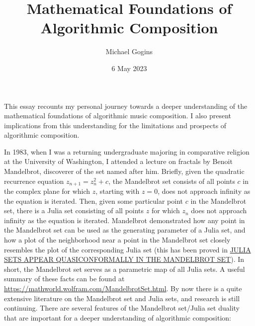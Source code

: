 \documentclass[11pt]{amsart}
\title{Mathematical Foundations of Algorithmic Composition}
\author{Michael Gogins}
\date{6 May 2023}                                           %
\begin{document}
\maketitle
This essay recounts my personal journey towards a deeper understanding of the mathematical foundations of algorithmic music composition. I also present  implications from this understanding for the limitations and prospects of algorithmic composition.

In 1983, when I was a returning undergraduate majoring in comparative religion at the University of Washington,  I attended a lecture on fractals by Benoit Mandelbrot, discoverer of the set named after him. Briefly, given the quadratic recurrence equation $z_{n+1} = z_n^2 + c$, the Mandelbrot set consists of all points $c$ in the complex plane for which $z$, starting with $z = 0$, does not approach infinity as the equation is iterated. Then, given some particular point $c$ in the Mandelbrot set, there is a Julia set consisting of all points $z$ for which $z_n$ does not approach infinity as the equation is iterated.  Mandelbrot demonstrated how any point in the Mandelbrot set can be used as the generating parameter of a Julia set, and how a plot of the neighborhood near a point in the Mandelbrot set closely resembles the plot of the corresponding Julia set (this has been proved in \href{https://arxiv.org/pdf/1804.00176.pdf}{JULIA SETS APPEAR QUASICONFORMALLY IN THE
MANDELBROT SET}). In short, the Mandelbrot set serves as a parametric map of all Julia sets. A useful summary of these facts can be found at \url{https://mathworld.wolfram.com/MandelbrotSet.html}. By now there is a quite extensive literature on the Mandelbrot set and Julia sets, and research is still continuing. There are several features of the Mandelbrot set/Julia set duality that are important for a deeper understanding of algorithmic composition:
\end{document}
